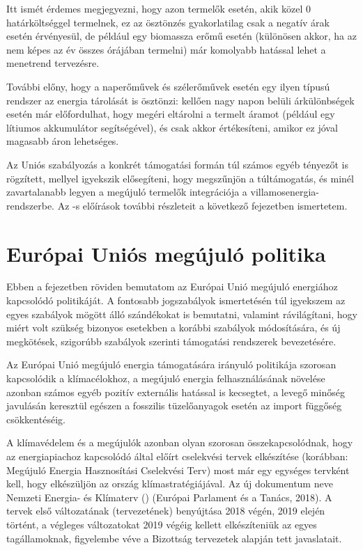 \documentclass[twoside, magyar, showtrims]{corvinusphd}
\theoremstyle{plain}
\theoremstyle{remark}
\theoremstyle{definition}
\begin{document}
Itt ismét érdemes megjegyezni, hogy azon termelők esetén,
akik közel 0 határköltséggel termelnek,
ez az ösztönzés gyakorlatilag csak a negatív árak
esetén érvényesül, de például egy biomassza
erőmű esetén (különösen akkor, ha az nem képes az év
összes órájában termelni) már komolyabb hatással
lehet a menetrend tervezésre.

További előny, hogy a naperőművek és
szélerőművek esetén egy ilyen típusú
rendszer az energia tárolását is ösztönzi:
kellően nagy napon belüli árkülönbségek
esetén már előfordulhat, hogy megéri eltárolni
a termelt áramot (például egy lítiumos akkumulátor 
segítségével), és csak akkor értékesíteni,
amikor ez jóval magasabb áron lehetséges.

Az Uniós szabályozás a konkrét támogatási formán túl
számos egyéb tényezőt is rögzített, mellyel igyekszik elősegíteni,
hogy megszűnjön a túltámogatás, és minél zavartalanabb legyen
a megújuló termelők integrációja a villamosenergia-rendszerbe.
Az -s előírások további részleteit a következő fejezetben
ismertetem.

\section{Európai Uniós megújuló politika}

Ebben a fejezetben röviden bemutatom az Európai Unió
megújuló energiához kapcsolódó politikáját.
A fontosabb jogszabályok ismertetésén túl igyekszem az
egyes szabályok mögött álló szándékokat is bemutatni,
valamint rávilágítani, hogy miért volt szükség bizonyos
esetekben a korábbi szabályok módosítására, 
és új megkötések, szigorúbb szabályok szerinti
támogatási rendszerek bevezetésére.

Az Európai Unió megújuló energia támogatására irányuló
politikája szorosan kapcsolódik a klímacélokhoz,
a megújuló energia felhasználásának
növelése azonban számos egyéb
pozitív externális hatással is kecsegtet,
a levegő minőség javulásán
keresztül egészen a fosszilis tüzelőanyagok
esetén az import függőség csökkentéséig.

A klímavédelem és a megújulók azonban olyan
szorosan összekapcsolódnak, hogy az energiapiachoz kapcsolódó
 által előírt cselekvési tervek elkészítése (korábban:
Megújuló Energia Hasznosítási Cselekvési Terv) most már 
egy egységes tervként kell, hogy
elkészüljön az ország klímastratégiájával.
Az új dokumentum neve Nemzeti
Energia- és Klímaterv ()
(Európai Parlament és a Tanács, 2018).
A tervek első változatának (tervezetének)
benyújtása 2018 végén, 2019 elején
történt, a végleges változatokat 2019
végéig kellett elkészíteniük az egyes tagállamoknak,
figyelembe véve a Bizottság tervezetek
alapján tett javaslatait.
\end{document}
